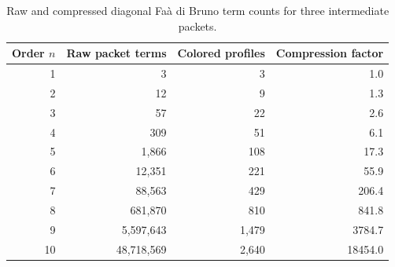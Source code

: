 \begin{table}[htbp]
\centering
\caption{Raw and compressed diagonal Fa\`a di Bruno term counts for three intermediate packets.}
\label{tab:block11-faa-counts}
\small
\begin{tabular}{rrrr}
\toprule
Order $n$ & Raw packet terms & Colored profiles & Compression factor\\
\midrule
1 & 3 & 3 & 1.0\\
2 & 12 & 9 & 1.3\\
3 & 57 & 22 & 2.6\\
4 & 309 & 51 & 6.1\\
5 & 1,866 & 108 & 17.3\\
6 & 12,351 & 221 & 55.9\\
7 & 88,563 & 429 & 206.4\\
8 & 681,870 & 810 & 841.8\\
9 & 5,597,643 & 1,479 & 3784.7\\
10 & 48,718,569 & 2,640 & 18454.0\\
\bottomrule
\end{tabular}
\end{table}
